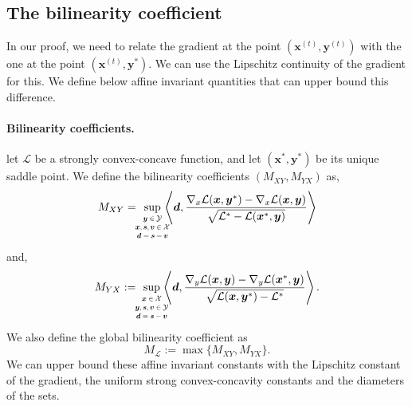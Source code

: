 \documentclass[twoside]{article}
\renewcommand{\L}{\mathcal{L}}
\newcommand{\X}{\mathcal{X}}
\newcommand{\Y}{\mathcal{Y}}
\newcommand{\prodscal}[2]{\left\langle#1,#2\right\rangle}
\newcommand{\x}{\bm{x}}
\newcommand{\y}{\bm{y}}
\newcommand{\s}{\bm{s}}
\newcommand{\xt}{\bm{x}^{(t)}}
\newcommand{\yt}{\bm{y}^{(t)}}
\newcommand{\dd}{\bm{d}}
\newcommand{\vv}{\bm{v}} %
\newcommand{\0}{\mathbf{0}} %
\begin{document}
%

\subsection{The bilinearity coefficient}

In our proof, we need to relate 
  the gradient at the point $(\xt,\yt)$ with the one at
  the point $(\xt, \y^*)$. We can use the Lipschitz continuity of the gradient for this. We define below affine invariant quantities that can upper bound this difference.
\paragraph{Bilinearity coefficients.} %
\label{par:bilinearity_coefficients}
%
  let $\L$ be a strongly convex-concave function, and let $(\x^*,\y^*)$ be its unique saddle point. We define the bilinearity coefficients $(M_{XY},M_{YX})$ as, 
    \begin{equation}   \label{def:M}
    M_{XY} = \hspace{-2mm} \sup_{\substack{\scalebox{0.65}{
       $ \begin{matrix}
                 \y \in \Y \\
                 \x, \s,\vv \in \X \\
                 \dd = \s -\vv   %
               \end{matrix}$
        }}} \hspace{-3mm} \prodscal{\dd}{\frac{\nabla_x\L(\x,\y^*)-\nabla_x\L(\x,\y)}{\sqrt{\L^*-\L(\x^*,\y)}}} 
    \end{equation}
  and, 
  \begin{equation}
      M_{YX}:=  \hspace{-2mm} \sup_{\substack{\scalebox{0.65}{
       $ \begin{matrix}
                 \x \in \X\\
                 \y, \s,\vv \in \Y \\
               \dd = \s-\vv
          \end{matrix}$
        }}} \hspace{-3mm} \prodscal{\dd}{\frac{\nabla_y\L(\x,\y)-\nabla_y\L(\x^*,\y)}{\sqrt{\L(\x,\y^*)-\L^*}}}.
  \end{equation}
  We also define the global bilinearity coefficient as
  \begin{equation}\label{eq:def_bilin_coef}
    M_\L := \max\{M_{XY},M_{YX}\}.
  \end{equation}
  We can upper bound these affine invariant constants with the Lipschitz constant of the gradient, the uniform strong convex-concavity constants and the diameters of the sets.
\end{document}
